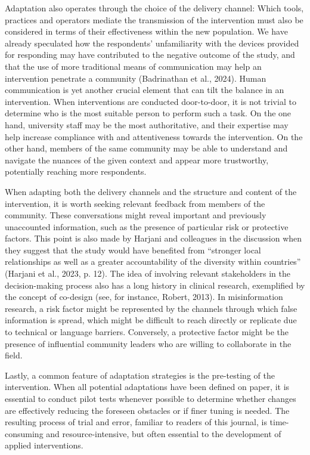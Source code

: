 \documentclass[authordate, empirical]{jote-new-article}
\begin{document}
	Adaptation also operates through the choice of the delivery channel: Which tools, practices and operators mediate the transmission of the intervention must also be considered in terms of their effectiveness within the new population. We have already speculated how the respondents' unfamiliarity with the devices provided for responding may have contributed to the negative outcome of the study, and that the use of more traditional means of communication may help an intervention penetrate a community (Badrinathan et al., 2024). Human communication is yet another crucial element that can tilt the balance in an intervention. When interventions are conducted door-to-door, it is not trivial to determine who is the most suitable person to perform such a task. On the one hand, university staff may be the most authoritative, and their expertise may help increase compliance with and attentiveness towards the intervention. On the other hand, members of the same community may be able to understand and navigate the nuances of the given context and appear more trustworthy, potentially reaching more respondents.



	When adapting both the delivery channels and the structure and content of the intervention, it is worth seeking relevant feedback from members of the community. These conversations might reveal important and previously unaccounted information, such as the presence of particular risk or protective factors. This point is also made by Harjani and colleagues in the discussion when they suggest that the study would have benefited from “stronger local relationships as well as a greater accountability of the diversity within countries” (Harjani et al., 2023, p. 12). The idea of involving relevant stakeholders in the decision-making process also has a long history in clinical research, exemplified by the concept of co-design (see, for instance, Robert, 2013). In misinformation research, a risk factor might be represented by the channels through which false information is spread, which might be difficult to reach directly or replicate due to technical or language barriers. Conversely, a protective factor might be the presence of influential community leaders who are willing to collaborate in the field.



	Lastly, a common feature of adaptation strategies is the pre-testing of the intervention. When all potential adaptations have been defined on paper, it is essential to conduct pilot tests whenever possible to determine whether changes are effectively reducing the foreseen obstacles or if finer tuning is needed. The resulting process of trial and error, familiar to readers of this journal, is time-consuming and resource-intensive, but often essential to the development of applied interventions.
\end{document}
